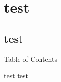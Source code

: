 \documentclass[xcolor=x11names,compress]{beamer}
\begin{document}
\begin{frame}[plain]
\titlepage
\end{frame}

\section{test}
\subsection{test}

\begin{frame}{Table of Contents}
\tableofcontents
\end{frame}


\begin{frame}{test}
    test
\end{frame}
\end{document}
